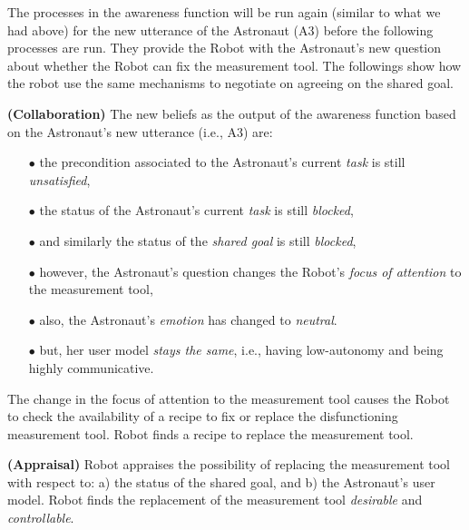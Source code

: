 The processes in the awareness function will be run again (similar to what we
had above) for the new utterance of the Astronaut (A3) before the following
processes are run. They provide the Robot with the Astronaut's new question
about whether the Robot can fix the measurement tool. The followings show how
the robot use the same mechanisms to negotiate on agreeing on the shared goal.

\noindent{}

\noindent\textbf{(Collaboration)} The new beliefs as the output of the awareness
function based on the Astronaut's new utterance (i.e., A3) are:

\begin{itemize}
  \item[$\bullet$] the precondition associated to the Astronaut's current
  \textit{task} is still \textit{unsatisfied},
  \item[$\bullet$] the status of the Astronaut's current \textit{task} is still
  \textit{blocked},
  \item[$\bullet$] and similarly the status of the \textit{shared goal} is
  still \textit{blocked},
  \item[$\bullet$] however, the Astronaut's question changes the Robot's
  \textit{focus of attention} to the measurement tool,
  \item[$\bullet$] also, the Astronaut's \textit{emotion} has changed to
  \textit{neutral}.
  \item[$\bullet$] but, her user model \textit{stays the same}, i.e.,
  having low-autonomy and being highly communicative.
\end{itemize}

The change in the focus of attention to the measurement tool causes the Robot to
check the availability of a recipe to fix or replace the disfunctioning
measurement tool. Robot finds a recipe to replace the measurement tool.

\noindent\textbf{(Appraisal)} Robot appraises the possibility of
replacing the measurement tool with respect to: a) the status of the shared
goal, and b) the Astronaut's user model. Robot finds the replacement of the
measurement tool \textit{desirable} and \textit{controllable}.

